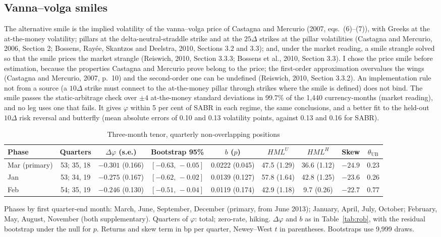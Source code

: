\documentclass[11pt]{article}
\theoremstyle{result}
\newcommand{\HML}{\mathit{HML}}
\newcommand{\thUB}{\theta_{\mathrm{UB}}}
\newcommand{\D}{\Delta}
\begin{document}
\subsection{Vanna--volga smiles}

The alternative smile is the implied volatility of the vanna--volga price of Castagna and Mercurio (2007, eqs.~(6)--(7)), with Greeks at the at-the-money volatility; pillars at the delta-neutral-straddle strike and at the $25\D$ strikes at the pillar volatilities (Castagna and Mercurio, 2006, Section 2; Bossens, Ray\'ee, Skantzos and Deelstra, 2010, Sections 3.2 and 3.3); and, under the market reading, a smile strangle solved so that the smile prices the market strangle (Reiswich, 2010, Section 3.3.3; Bossens et al., 2010, Section 3.3). I chose the price smile before estimation, because the properties Castagna and Mercurio prove belong to the price; the first-order approximation overvalues the wings (Castagna and Mercurio, 2007, p.~10) and the second-order one can be undefined (Reiswich, 2010, Section 3.3.2). An implementation rule not from a source (a $10\D$ strike must connect to the at-the-money pillar through strikes where the smile is defined) does not bind. The smile passes the static-arbitrage check over $\pm4$ at-the-money standard deviations in 99.7\% of the 1,440 currency-months (market reading), and no leg uses one that fails. It gives $\varphi$ within 5 per cent of SABR in each regime, the same conclusions, and a better fit to the held-out $10\D$ risk reversal and butterfly (mean absolute errors of 0.10 and 0.13 volatility points, against 0.13 and 0.16 for SABR).

\begin{table}[t]
\centering\footnotesize
\setlength{\tabcolsep}{3pt}
\caption{Three-month tenor, quarterly non-overlapping positions}\label{tab:3m}
\begin{tabular}{lcccccccc}
\toprule
Phase & Quarters & $\D\varphi$ (s.e.) & Bootstrap 95\% & $b$ ($p$) & $\HML^U$ & $\HML^H$ & Skew & $\thUB$ \\
\midrule
Mar (primary) & 53; 35, 18 & $-0.301$ (0.166) & $[-0.63,\,-0.05]$ & 0.0222 (0.045) & 47.5 (1.29) & 36.6 (1.12) & $-24.9$ & 0.23 \\
Jan & 53; 34, 19 & $-0.275$ (0.167) & $[-0.62,\,-0.02]$ & 0.0139 (0.127) & 57.8 (1.64) & 42.8 (1.25) & $-23.6$ & 0.26 \\
Feb & 54; 35, 19 & $-0.246$ (0.130) & $[-0.51,\,-0.04]$ & 0.0119 (0.174) & 42.9 (1.18) & 9.7 (0.26) & $-22.7$ & 0.77 \\
\bottomrule
\end{tabular}
\par\medskip
\begin{minipage}{0.97\linewidth}
Phases by first quarter-end month: March, June, September, December (primary, from June 2013); January, April, July, October; February, May, August, November (both supplementary). Quarters of $\varphi$: total; zero-rate, hiking. $\D\varphi$ and $b$ as in Table~\ref{tab:rob}, with the residual bootstrap under the null for $p$. Returns and skew term in bp per quarter, Newey--West $t$ in parentheses. Bootstraps use 9,999 draws.
\end{minipage}
\end{table}
\end{document}

